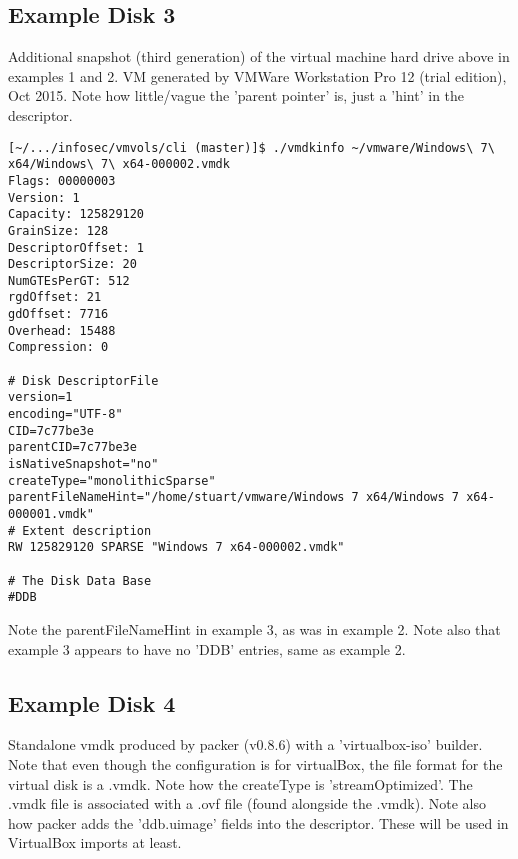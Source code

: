 \documentclass{article}
\begin{document}
\subsection{Example Disk 3}

Additional snapshot (third generation) of the virtual machine hard
drive above in examples 1 and 2. VM generated by VMWare Workstation
Pro 12 (trial edition), Oct 2015.  Note how little/vague the 'parent
pointer' is, just a 'hint' in the descriptor.

\begin{verbatim}
[~/.../infosec/vmvols/cli (master)]$ ./vmdkinfo ~/vmware/Windows\ 7\ x64/Windows\ 7\ x64-000002.vmdk 
Flags: 00000003
Version: 1
Capacity: 125829120
GrainSize: 128
DescriptorOffset: 1
DescriptorSize: 20
NumGTEsPerGT: 512
rgdOffset: 21
gdOffset: 7716
Overhead: 15488
Compression: 0

# Disk DescriptorFile
version=1
encoding="UTF-8"
CID=7c77be3e
parentCID=7c77be3e
isNativeSnapshot="no"
createType="monolithicSparse"
parentFileNameHint="/home/stuart/vmware/Windows 7 x64/Windows 7 x64-000001.vmdk"
# Extent description
RW 125829120 SPARSE "Windows 7 x64-000002.vmdk"

# The Disk Data Base 
#DDB
\end{verbatim}

Note the parentFileNameHint in example 3, as was in example 2.  Note
also that example 3 appears to have no 'DDB' entries, same as example 2.


\subsection{Example Disk 4}

Standalone vmdk produced by packer (v0.8.6) with a 'virtualbox-iso'
builder.  Note that even though the configuration is for virtualBox,
the file format for the virtual disk is a .vmdk.  Note how the
createType is 'streamOptimized'.  The .vmdk file is associated with a
.ovf file (found alongside the .vmdk).  Note also how packer adds the
'ddb.uimage' fields into the descriptor.  These will be used in
VirtualBox imports at least.
\end{document}

